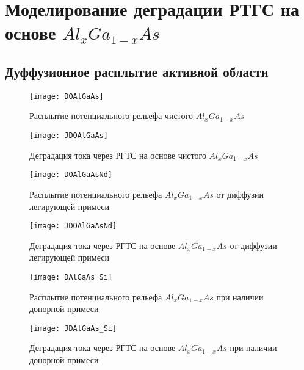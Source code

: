 \chapter{Моделирование деградации РТГС на основе $Al_{x}Ga_{1−x}As$}
\section{Дуффузионное расплытие активной области}
\begin{figure}[h]
	\centering
	\texttt{[image: DOAlGaAs]}
	\caption{Расплытие потенциального рельефа чистого $Al_{x}Ga_{1−x}As$}
	\label{fig:DOAlGaAs}
\end{figure}

\begin{figure}[h]
	\centering
	\texttt{[image: JDOAlGaAs]}
	\caption{Деградация тока через РГТС на основе чистого $Al_{x}Ga_{1−x}As$}
	\label{fig:JDOAlGaAs}
\end{figure}

\begin{figure}[h]
	\centering
	\texttt{[image: DOAlGaAsNd]}
	\caption{Расплытие потенциального рельефа $Al_{x}Ga_{1−x}As$ от диффузии легирующей примеси} 
	\label{fig:DOAlGaAsNd}
\end{figure}

\begin{figure}[h]
	\centering
	\texttt{[image: JDOAlGaAsNd]}
	\caption{Деградация тока через РГТС на основе $Al_{x}Ga_{1−x}As$ от диффузии легирующей примеси}
	\label{fig:JDOAlGaAsNd}
\end{figure}

\begin{figure}[h]
	\centering
	\texttt{[image: DAlGaAs\_Si]}
	\caption{Расплытие потенциального рельефа $Al_{x}Ga_{1−x}As$ при наличии донорной примеси} 
	\label{fig:DAlGaAs_Si}
\end{figure}

\begin{figure}[h]
	\centering
	\texttt{[image: JDAlGaAs\_Si]}
	\caption{Деградация тока через РГТС на основе $Al_{x}Ga_{1−x}As$ при наличии донорной примеси}
	\label{fig:JDAlGaAs_Si}
\end{figure}